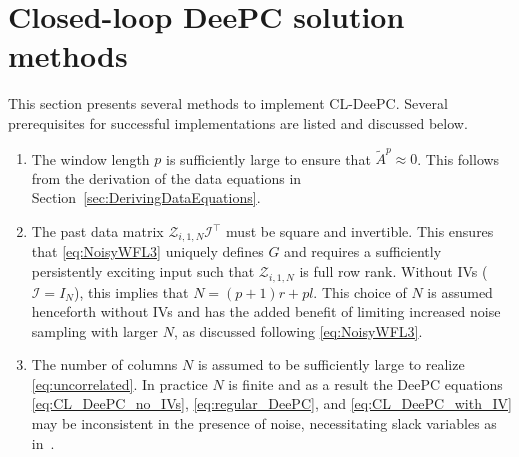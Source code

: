 \section{Closed-loop \acs{DeePC} solution methods}\label{sec:SolutionMethods}
This section presents several methods to implement \ac{CL-DeePC}. Several prerequisites for successful implementations are listed and discussed below.
\begin{enumerate}
    \item The window length $p$ is sufficiently large to ensure that $\tilde{A}^p\approx 0$. This follows from the derivation of the data equations in Section~\ref{sec:DerivingDataEquations}.
    \item The past data matrix $\mathcal{Z}_{i,1,N}\mathcal{I}^\top$ must be square and invertible. This ensures that \eqref{eq:NoisyWFL3} uniquely defines $G$ and requires a sufficiently persistently exciting input such that $\mathcal{Z}_{i,1,N}$ is full row rank. Without \ac{IVs} ($\mathcal{I}=I_N$), this implies that $N=(p+1)r+pl$. This choice of $N$ is assumed henceforth without \ac{IVs} and has the added benefit of limiting increased noise sampling with larger $N$, as discussed following \eqref{eq:NoisyWFL3}.
    \item The number of columns $N$ is assumed to be sufficiently large to realize \eqref{eq:uncorrelated}. In practice $N$ is finite and as a result the \ac{DeePC} equations \eqref{eq:CL_DeePC_no_IVs}, \eqref{eq:regular_DeePC}, and \eqref{eq:CL_DeePC_with_IV} may be inconsistent in the presence of noise, necessitating slack variables as in~\cite{Coulson2019}.
\end{enumerate}
% 
%
